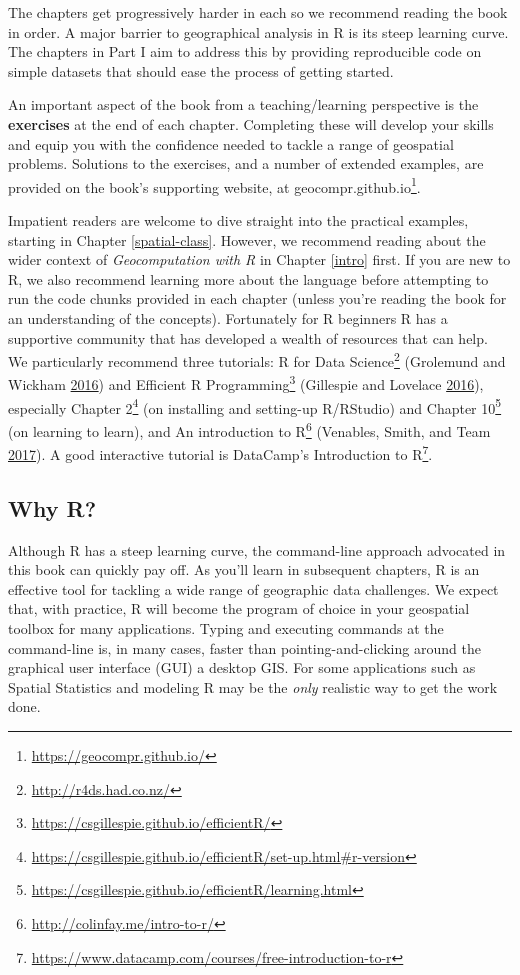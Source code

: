 \documentclass[]{krantz}
\let\rmarkdownfootnote\footnote%
\def\footnote{\protect\rmarkdownfootnote}
\renewcommand{\href}[2]{#2\footnote{\url{#1}}}
\begin{document}
The chapters get progressively harder in each so we recommend reading the book in order.
A major barrier to geographical analysis in R is its steep learning curve.
The chapters in Part I aim to address this by providing reproducible code on simple datasets that should ease the process of getting started.

An important aspect of the book from a teaching/learning perspective is the \textbf{exercises} at the end of each chapter.
Completing these will develop your skills and equip you with the confidence needed to tackle a range of geospatial problems.
Solutions to the exercises, and a number of extended examples, are provided on the book's supporting website, at \href{https://geocompr.github.io/}{geocompr.github.io}.

Impatient readers are welcome to dive straight into the practical examples, starting in Chapter \ref{spatial-class}.
However, we recommend reading about the wider context of \emph{Geocomputation with R} in Chapter \ref{intro} first.
If you are new to R, we also recommend learning more about the language before attempting to run the code chunks provided in each chapter (unless you're reading the book for an understanding of the concepts).
Fortunately for R beginners R has a supportive community that has developed a wealth of resources that can help.
We particularly recommend three tutorials: \href{http://r4ds.had.co.nz/}{R for Data Science} (Grolemund and Wickham \protect\hyperlink{ref-grolemund_r_2016}{2016}) and \href{https://csgillespie.github.io/efficientR/}{Efficient R Programming} (Gillespie and Lovelace \protect\hyperlink{ref-gillespie_efficient_2016}{2016}), especially \href{https://csgillespie.github.io/efficientR/set-up.html\#r-version}{Chapter 2} (on installing and setting-up R/RStudio) and \href{https://csgillespie.github.io/efficientR/learning.html}{Chapter 10} (on learning to learn), and \href{http://colinfay.me/intro-to-r/}{An introduction to R} (Venables, Smith, and Team \protect\hyperlink{ref-venables_introduction_2017}{2017}).
A good interactive tutorial is DataCamp's \href{https://www.datacamp.com/courses/free-introduction-to-r}{Introduction to R}.

\hypertarget{why-r}{%
\subsection*{Why R?}\label{why-r}}

Although R has a steep learning curve, the command-line approach advocated in this book can quickly pay off.
As you'll learn in subsequent chapters, R is an effective tool for tackling a wide range of geographic data challenges.
We expect that, with practice, R will become the program of choice in your geospatial toolbox for many applications.
Typing and executing commands at the command-line is, in many cases, faster than pointing-and-clicking around the graphical user interface (GUI) a desktop GIS.
For some applications such as Spatial Statistics and modeling R may be the \emph{only} realistic way to get the work done.
\end{document}

